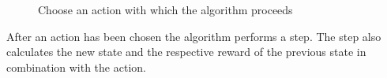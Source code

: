 \documentclass{article}
\begin{document}
	
	
	
	
	
	\begin{figure}
		\caption{Choose an action with which the algorithm proceeds}
		\label{code:chooseAction}
		
	\end{figure}
	\newpage
	
	
	\noindent After an action has been chosen the algorithm performs a step. 
	The step also calculates the new state and the respective reward of the previous state in combination with the action.
	
	
	
	
	
\end{document}
